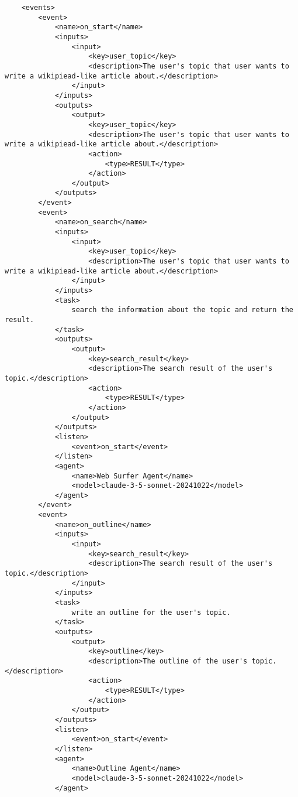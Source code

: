 \begin{lstlisting}
    <events>
        <event>
            <name>on_start</name>
            <inputs>
                <input>
                    <key>user_topic</key>
                    <description>The user's topic that user wants to write a wikipiead-like article about.</description>
                </input>
            </inputs>
            <outputs>
                <output>
                    <key>user_topic</key>
                    <description>The user's topic that user wants to write a wikipiead-like article about.</description>
                    <action>
                        <type>RESULT</type>
                    </action>
                </output>
            </outputs>
        </event>
        <event>
            <name>on_search</name>
            <inputs>
                <input>
                    <key>user_topic</key>
                    <description>The user's topic that user wants to write a wikipiead-like article about.</description>
                </input>
            </inputs>
            <task>
                search the information about the topic and return the result.
            </task>
            <outputs>
                <output>
                    <key>search_result</key>
                    <description>The search result of the user's topic.</description>
                    <action>
                        <type>RESULT</type>
                    </action>
                </output>
            </outputs>
            <listen>
                <event>on_start</event>
            </listen>
            <agent>
                <name>Web Surfer Agent</name>
                <model>claude-3-5-sonnet-20241022</model>
            </agent>
        </event>
        <event>
            <name>on_outline</name>
            <inputs>
                <input>
                    <key>search_result</key>
                    <description>The search result of the user's topic.</description>
                </input>
            </inputs>
            <task>
                write an outline for the user's topic.
            </task>
            <outputs>
                <output>
                    <key>outline</key>
                    <description>The outline of the user's topic.</description>
                    <action>
                        <type>RESULT</type>
                    </action>
                </output>
            </outputs>
            <listen>
                <event>on_start</event>
            </listen>
            <agent>
                <name>Outline Agent</name>
                <model>claude-3-5-sonnet-20241022</model>
            </agent>

\end{lstlisting}
